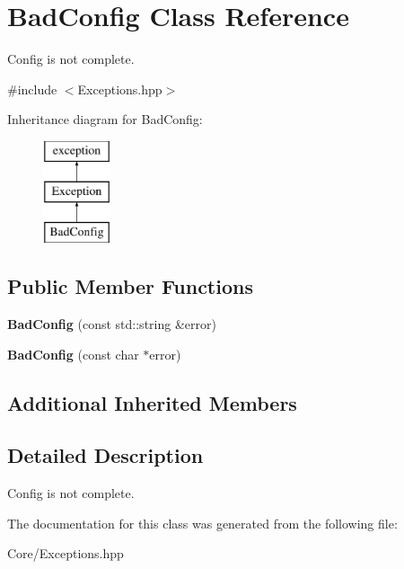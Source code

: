 \hypertarget{class_bad_config}{\section{Bad\-Config Class Reference}
\label{class_bad_config}
}


Config is not complete.  




{\ttfamily \#include $<$Exceptions.\-hpp$>$}

Inheritance diagram for Bad\-Config\-:\begin{figure}[H]
\begin{center}
\leavevmode
\includegraphics[height=3.000000cm]{class_bad_config}
\end{center}
\end{figure}
\subsection*{Public Member Functions}
\begin{DoxyCompactItemize}
\item 
\hypertarget{class_bad_config_a2f9e1e294d617c65268b36eb7668a1db}{{\bfseries Bad\-Config} (const std\-::string \&error)}\label{class_bad_config_a2f9e1e294d617c65268b36eb7668a1db}

\item 
\hypertarget{class_bad_config_a0fe20153a015ee59c7f7e63f550d99d8}{{\bfseries Bad\-Config} (const char $\ast$error)}\label{class_bad_config_a0fe20153a015ee59c7f7e63f550d99d8}

\end{DoxyCompactItemize}
\subsection*{Additional Inherited Members}


\subsection{Detailed Description}
Config is not complete. 

The documentation for this class was generated from the following file\-:\begin{DoxyCompactItemize}
\item 
Core/Exceptions.\-hpp\end{DoxyCompactItemize}
